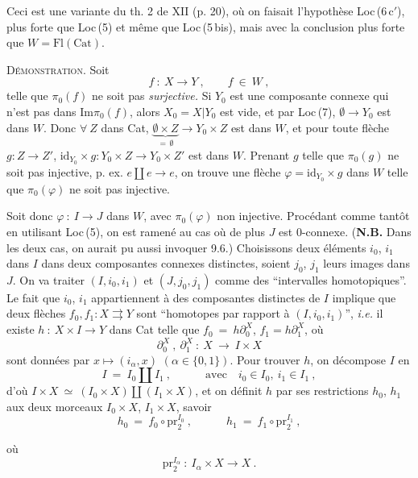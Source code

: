 \documentclass[11pt]{article}
\newcommand{\printedpage}[1]{\marginpar{\footnotesize p.~#1}}
\newcommand{\msp}[1]{\marginpar{\footnotesize [#1]}}
\newcommand{\Fl}{\mathrm{Fl}}
\newcommand{\Cat}{\mathrm{Cat}}
\newcommand{\id}{\mathrm{id}}
\newcommand{\pr}{\mathrm{pr}}
\begin{document}
Ceci est une variante du th. 2 de XII (p. 20), où on faisait l'hypothèse Loc\,(6\,c$'$), plus forte que Loc\,(5) et même que Loc\,(5\,bis), mais avec la conclusion plus forte que $W=\Fl(\Cat)$.

\textsc{Démonstration}. Soit
\[
f\ :\ X\longrightarrow Y\ ,\qquad f\ \in\ W\ ,
\]
telle que $\pi_0(f)$ ne soit pas \textit{surjective.} Si $Y_0$ est une composante connexe qui n'est pas dans $\mathrm{Im}\pi_0(f)$, alors $X_0=X|Y_0$ est vide, et par Loc\,(7), $\emptyset\longrightarrow Y_0$ est dans $W$. Donc $\forall\ Z$ dans Cat, %
$\underbrace{\emptyset\times Z}_{=\,\emptyset}\longrightarrow Y_0\times Z$ est dans $W$, et pour toute flèche $g : Z\longrightarrow Z'$, $\id_{Y_0}\times g : Y_0\times Z\longrightarrow Y_0\times Z'$ est dans $W$. Prenant $g$ telle que $\pi_0(g)$ ne soit pas injective, p. ex. $e\amalg e\longrightarrow e$, on trouve une flèche $\varphi=\id_{Y_0}\times g$ dans $W$ telle que $\pi_0(\varphi)$ ne soit pas injective.

\msp{page 127}

Soit donc $\varphi\ :\ I\longrightarrow J$ dans $W$, avec $\pi_0(\varphi)$ non injective. Procédant comme tantôt en utilisant Loc\,(5), on est ramené au cas où de plus $J$ est $0$-connexe. (\textbf{N.B.} Dans les deux cas, on aurait pu aussi invoquer 9.6.) Choisissons deux éléments $i_0$, $i_1$ dans $I$ dans deux composantes connexes distinctes, soient $j_0$, $j_1$ leurs images dans $J$. On va traiter $(I,i_0,i_1)$ et $(J,j_0,j_1)$ comme des “intervalles homotopiques”. Le fait que $i_0$, $i_1$ appartiennent à des composantes distinctes de $I$ implique que deux flèches $f_0,f_1 : X\rightrightarrows Y$ sont “homotopes par rapport à $(I,i_0,i_1)$”, \textit{i.e.} il existe $h\ :\ X\times I\longrightarrow Y$ dans Cat telle que $f_0\ =\ h\partial_0^X$, $f_1=h\partial_1^X$, où
\[
\partial_0^X\ ,\ \partial_1^X\ :\ X\ \longrightarrow\ I\times X
\]
sont données par $x\longmapsto(i_\alpha,x)$ $(\alpha\in\{0,1\})$. Pour trouver $h$, on décompose $I$ en
\[
I\ =\ I_0\amalg I_1\ ,\qquad\quad \text{avec}\quad i_0\in I_0,\ i_1\in I_1\ ,
\]
d'où $I\times X\ \simeq\ (I_0\times X)\amalg(I_1\times X)$, et on définit $h$ par ses restrictions $h_0$, $h_1$ aux deux morceaux $I_0\times X$, $I_1\times X$, savoir
\[
h_0\ =\ f_0\circ\mathrm{pr}_2^{I_0}\ ,\qquad\quad h_1\ =\ f_1\circ\mathrm{pr}_2^{I_1}\ ,
\]

\printedpage{69}
où
\[
\pr_2^{I_\alpha}\ :\ I_\alpha\times X \longrightarrow X\ .
\]
\end{document}
